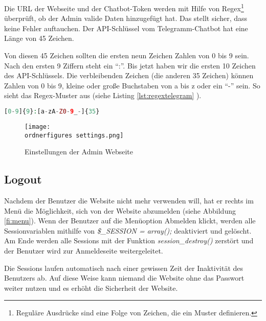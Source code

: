 Die URL der Webseite und der Chatbot-Token werden mit Hilfe von Regex\footnote{Reguläre Ausdrücke sind eine Folge von Zeichen, die ein Muster definieren.} überprüft, ob der Admin valide Daten hinzugefügt hat. Das stellt sicher, dass keine Fehler auftauchen. Der API-Schlüssel vom Telegramm-Chatbot hat eine Länge von 45 Zeichen. 

Von diesen 45 Zeichen sollten die ersten neun Zeichen Zahlen von 0 bis 9 sein. Nach den ersten 9 Ziffern steht ein ``:''. Bis jetzt haben wir die ersten 10 Zeichen des API-Schlüssels. Die verbleibenden Zeichen (die anderen 35 Zeichen) können Zahlen von 0 bis 9, kleine oder große Buchstaben von a bis z oder ein ``-'' sein. So sieht das Regex-Muster aus (siehe Listing \ref{lst:regextelegram} ).
\begin{lstlisting}[caption={Regex Muster für Telegram Chatbot API-Key},label={lst:regextelegram},language=PHP]
[0-9]{9}:[a-zA-Z0-9_-]{35}
\end{lstlisting}

\begin{figure}[H]
	\centering
	\texttt{[image: \\ordnerfigures settings.png]}
	\caption{Einstellungen der Admin Webseite}
	\label{fi:settings}
\end{figure}

\subsection{Logout}
Nachdem der Benutzer die Website nicht mehr verwenden will, hat er rechts im Menü die Möglichkeit, sich von der Website abzumelden (siehe Abbildung \ref{fi:menu}). Wenn der Benutzer auf die Menüoption Abmelden klickt, werden alle Sessionvariablen  mithilfe von \textit{\$\_SESSION = array();} deaktiviert und gelöscht. Am Ende werden alle Sessions mit der Funktion \textit{session\_destroy()} zerstört und der Benutzer wird zur Anmeldeseite weitergeleitet.

Die Sessions laufen automatisch nach einer gewissen Zeit der Inaktivität des Benutzers ab. Auf diese Weise kann niemand die Website ohne das Passwort weiter nutzen und es erhöht die Sicherheit der Website.

